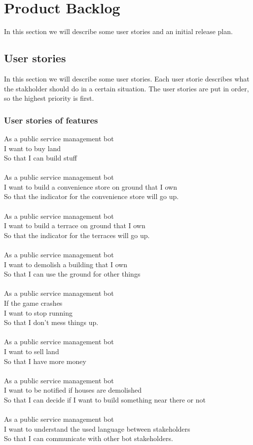 \section{Product Backlog}
In this section we will describe some user stories and an initial release plan.

\subsection{User stories}
In this section we will describe some user stories. Each user storie describes what the stakholder should do in a certain situation. The user stories are put in order, so the highest priority is first.
\subsubsection{User stories of features}
As a public service management bot\\
I want to buy land\\
So that I can build stuff\\
\\
As a public service management bot\\
I want to build a convenience store on ground that I own\\
So that the indicator for the convenience store will go up.\\
\\
As a public service management bot\\
I want to build a terrace on ground that I own\\
So that the indicator for the terraces will go up.\\
\\
As a public service management bot\\
I want to demolish a building that I own\\
So that I can use the ground for other things\\
\\
As a public service management bot\\
If the game crashes\\
I want to stop running\\
So that I don't mess things up.\\
\\
As a public service management bot\\
I want to sell land\\
So that I have more money\\
\\
As a public service management bot\\
I want to be notified if houses are demolished\\
So that I can decide if I want to build something near there or not\\
\\
As a public service management bot\\
I want to understand the used language between stakeholders\\
So that I can communicate with other bot stakeholders.\\
\\


